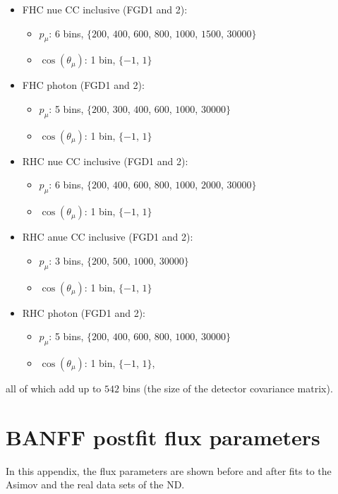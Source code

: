 \begin{itemize}
  
\item \Gls{FHC} \Gls{nue} \Gls{CC} inclusive (\Gls{FGD}1 and 2):
  \begin{itemize}
  \item $p_\mu$: 6 bins, $\{200$, $400$, $600$, $800$, $1000$, $1500$, $30000\}$
  \item $\cos(\theta_\mu)$: 1 bin, $\{-1$, $1\}$
  \end{itemize}
\item \Gls{FHC} photon (\Gls{FGD}1 and 2):
  \begin{itemize}
  \item $p_\mu$: 5 bins, $\{200$, $300$, $400$, $600$, $1000$, $30000\}$
  \item $\cos(\theta_\mu)$: 1 bin, $\{-1$, $1\}$
  \end{itemize}
\item \Gls{RHC} \Gls{nue} \Gls{CC} inclusive (\Gls{FGD}1 and 2):
  \begin{itemize}
  \item $p_\mu$: 6 bins, $\{200$, $400$, $600$, $800$, $1000$, $2000$, $30000\}$
  \item $\cos(\theta_\mu)$: 1 bin, $\{-1$, $1\}$
  \end{itemize}
\item \Gls{RHC} \Gls{anue} \Gls{CC} inclusive (\Gls{FGD}1 and 2):
  \begin{itemize}
  \item $p_\mu$: 3 bins, $\{200$, $500$, $1000$, $30000\}$
  \item $\cos(\theta_\mu)$: 1 bin, $\{-1$, $1\}$
  \end{itemize}
\item \Gls{RHC} photon (\Gls{FGD}1 and 2):
  \begin{itemize}
  \item $p_\mu$: 5 bins, $\{200$, $400$, $600$, $800$, $1000$, $30000\}$
  \item $\cos(\theta_\mu)$: 1 bin, $\{-1$, $1\}$,
  \end{itemize}
\end{itemize}
all of which add up to $542$ bins (the size of the detector covariance matrix).


\chapter{BANFF postfit flux parameters}
\label{app:fluxparam}

In this appendix, the flux parameters are shown before and after fits
to the \Gls{Asimov} and the real data sets of the \Gls{ND}.

